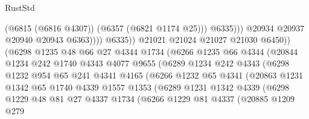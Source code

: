 \begin{lexlean}{RustStd}
\begin{coremodule}
                                          (@6815 (@6816 @4307))
                                          (@6357 (@6821 @1174 @25)))
                                        @6335)))
                                  @20934
                                  @20937
                                  @20940
                                  @20943
                                  @6363))))
                          @6335))
                      @21021
                      @21024
                      @21027
                      @21030
                      @6450))
                  (@6298
                    @1235
                    @48
                    @66
                    @27
                    @4344
                    @1734
                    (@6266
                      @1235
                      @66
                      @4344
                      (@20844
                        @1234
                        @242
                        @1740
                        @4343
                        @4077
                        @9655
                        (@6289
                          @1234
                          @242
                          @4343
                          (@6298
                            @1232
                            @954
                            @65
                            @241
                            @4341
                            @4165
                            (@6266
                              @1232
                              @65
                              @4341
                              (@20863
                                @1231
                                @1342
                                @65
                                @1740
                                @4339
                                @1557
                                @1353
                                (@6289
                                  @1231
                                  @1342
                                  @4339
                                  (@6298
                                    @1229
                                    @48
                                    @81
                                    @27
                                    @4337
                                    @1734
                                    (@6266
                                      @1229
                                      @81
                                      @4337
                                      (@20885
                                        @1209
                                        @279

\end{coremodule}
\end{lexlean}
